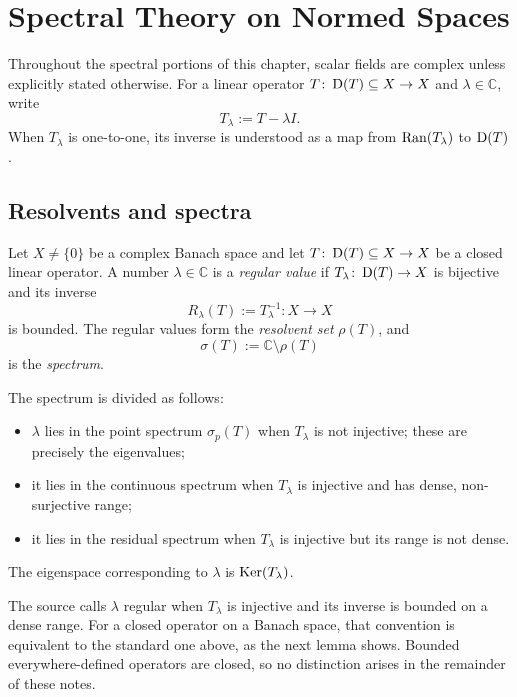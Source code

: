 \chapter{Spectral Theory on Normed Spaces}

Throughout the spectral portions of this chapter, scalar fields are complex
unless explicitly stated otherwise.  For a linear operator
$T\colon\operatorname{D}(T)\subseteq X\to X$ and $\lambda\in\mathbb C$, write
\[
  T_\lambda:=T-\lambda I.
\]
When $T_\lambda$ is one-to-one, its inverse is understood as a map from
$\operatorname{Ran}(T_\lambda)$ to $\operatorname{D}(T)$.

\section{Resolvents and spectra}

\begin{notedefinition}
Let $X\ne\{0\}$ be a complex Banach space and let
$T\colon\operatorname{D}(T)\subseteq X\to X$ be a closed linear operator.  A number
$\lambda\in\mathbb C$ is a \emph{regular value} if
$T_\lambda\colon\operatorname{D}(T)\to X$ is bijective and its inverse
\[
  R_\lambda(T):=T_\lambda^{-1}\colon X\to X
\]
is bounded.  The regular values form the \emph{resolvent set} $\rho(T)$,
and
\[
  \sigma(T):=\mathbb C\setminus\rho(T)
\]
is the \emph{spectrum}.

The spectrum is divided as follows:
\begin{itemize}
  \item $\lambda$ lies in the point spectrum $\sigma_p(T)$ when
        $T_\lambda$ is not injective; these are precisely the eigenvalues;
  \item it lies in the continuous spectrum when $T_\lambda$ is injective
        and has dense, non-surjective range;
  \item it lies in the residual spectrum when $T_\lambda$ is injective but
        its range is not dense.
\end{itemize}
The eigenspace corresponding to $\lambda$ is $\operatorname{Ker}(T_\lambda)$.
\end{notedefinition}

\begin{noteremark}
The source calls $\lambda$ regular when $T_\lambda$ is injective and its
inverse is bounded on a dense range.  For a closed operator on a Banach space,
that convention is equivalent to the standard one above, as the next lemma
shows.  Bounded everywhere-defined operators are closed, so no distinction
arises in the remainder of these notes.
\end{noteremark}

